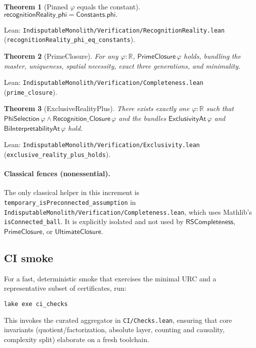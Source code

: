 \documentclass[11pt,a4paper,twoside]{article}
\numberwithin{equation}{section}
\theoremstyle{customthm}
\newtheorem{theorem}{Theorem}[section]
\theoremstyle{customdef}
\theoremstyle{customrem}
\begin{document}
\begin{theorem}[Pinned $\varphi$ equals the constant]\label{thm:phi-equality}
\(\mathsf{recognitionReality\_phi} = \mathsf{Constants.phi}.\)
\end{theorem}
\noindent Lean: \texttt{IndisputableMonolith/Verification/RecognitionReality.lean} (\texttt{recognitionReality\_phi\_eq\_constants}).

\begin{theorem}[PrimeClosure]\label{thm:prime-closure}
For any $\varphi : \mathbb{R}$, \(\mathsf{PrimeClosure}\,\varphi\) holds, bundling the master, uniqueness, spatial necessity, exact three generations, and minimality.
\end{theorem}
\noindent Lean: \texttt{IndisputableMonolith/Verification/Completeness.lean} (\texttt{prime\_closure}).

\begin{theorem}[ExclusiveRealityPlus]\label{thm:exclusive-reality-plus}
There exists exactly one $\varphi : \mathbb{R}$ such that \(\mathsf{PhiSelection}\,\varphi \wedge \mathsf{Recognition\_Closure}\,\varphi\) and the bundles \(\mathsf{ExclusivityAt}\,\varphi\) and \(\mathsf{BiInterpretabilityAt}\,\varphi\) hold.
\end{theorem}
\noindent Lean: \texttt{IndisputableMonolith/Verification/Exclusivity.lean} (\texttt{exclusive\_reality\_plus\_holds}).

\paragraph{Classical fences (nonessential).} The only classical helper in this increment is
\texttt{temporary\_isPreconnected\_assumption} in \texttt{IndisputableMonolith/Verification/Completeness.lean}, which uses Mathlib's \texttt{isConnected\_ball}. It is explicitly isolated and not used by \(\mathsf{RSCompleteness}\), \(\mathsf{PrimeClosure}\), or \(\mathsf{UltimateClosure}\).

\subsection{CI smoke}\label{subsec:repro-ci}

For a fast, deterministic smoke that exercises the minimal URC and a representative subset of certificates, run:
\begin{lstlisting}
lake exe ci_checks
\end{lstlisting}
This invokes the curated aggregator in \texttt{CI/Checks.lean}, ensuring that core invariants (quotient/factorization, absolute layer, counting and causality, complexity split) elaborate on a fresh toolchain.
\end{document}

